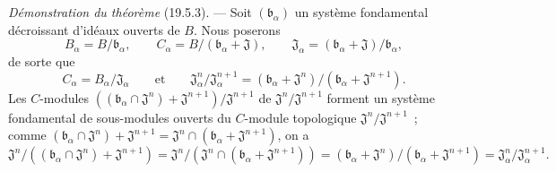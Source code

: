 \begin{env}[19.5.6]
\label{0.19.5.6-fr}
\emph{Démonstration du théorème} (19.5.3). --- Soit
$(\mathfrak b_\alpha)$ un système fondamental décroissant d'idéaux ouverts de
$B$. Nous poserons
\[
  B_\alpha=B/\mathfrak b_\alpha,\qquad
  C_\alpha=B/(\mathfrak b_\alpha+\mathfrak J),\qquad
  \mathfrak J_\alpha=(\mathfrak b_\alpha+\mathfrak J)/\mathfrak b_\alpha,
\]
de sorte que
\[
  C_\alpha=B_\alpha/\mathfrak J_\alpha\qquad\text{et}\qquad
  \mathfrak J_\alpha^n/\mathfrak J_\alpha^{n+1}
  =(\mathfrak b_\alpha+\mathfrak J^n)/(\mathfrak b_\alpha+\mathfrak J^{n+1}).
\]
Les $C$-modules
$((\mathfrak b_\alpha\cap\mathfrak J^n)+\mathfrak J^{n+1})/
\mathfrak J^{n+1}$ de $\mathfrak J^n/\mathfrak J^{n+1}$ forment un système
fondamental de sous-modules ouverts du $C$-module topologique
$\mathfrak J^n/\mathfrak J^{n+1}$~; comme
$(\mathfrak b_\alpha\cap\mathfrak J^n)+\mathfrak J^{n+1}
=\mathfrak J^n\cap(\mathfrak b_\alpha+\mathfrak J^{n+1})$, on a
\[
  \mathfrak J^n/((\mathfrak b_\alpha\cap\mathfrak J^n)+\mathfrak J^{n+1})
  =\mathfrak J^n/(\mathfrak J^n\cap(\mathfrak b_\alpha+\mathfrak J^{n+1}))
  =(\mathfrak b_\alpha+\mathfrak J^n)/(\mathfrak b_\alpha+\mathfrak J^{n+1})
  =\mathfrak J_\alpha^n/\mathfrak J_\alpha^{n+1}.
\]
\end{env}

